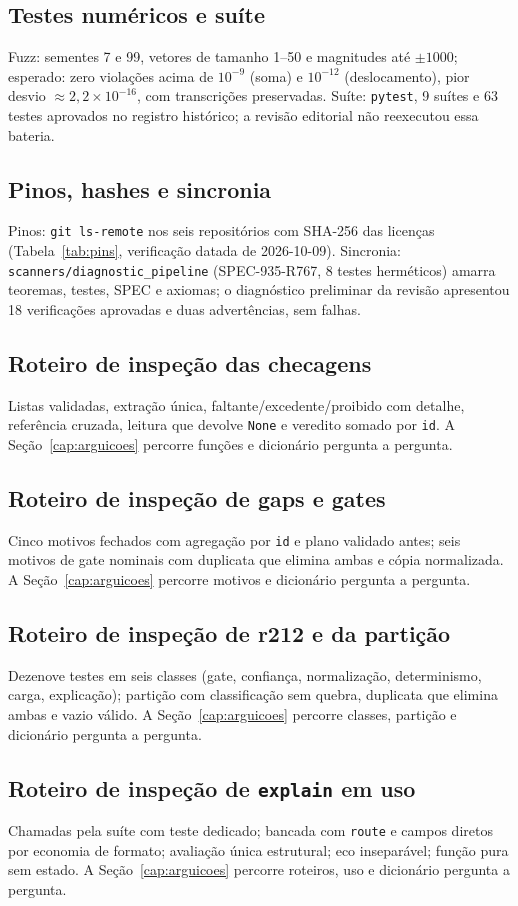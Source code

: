 \subsection{Testes numéricos e suíte}
Fuzz: sementes 7 e 99, vetores de tamanho 1--50 e magnitudes até $\pm1000$; esperado: zero violações acima de $10^{-9}$ (soma) e $10^{-12}$ (deslocamento), pior desvio $\approx2{,}2\times10^{-16}$, com transcrições preservadas. Suíte: \texttt{pytest}, 9 suítes e 63 testes aprovados no registro histórico; a revisão editorial não reexecutou essa bateria.
\subsection{Pinos, hashes e sincronia}
Pinos: \texttt{git ls-remote} nos seis repositórios com SHA-256 das licenças (Tabela~\ref{tab:pins}, verificação datada de 2026-10-09). Sincronia: \nolinkurl{scanners/diagnostic_pipeline} (SPEC-935-R767, 8 testes herméticos) amarra teoremas, testes, SPEC e axiomas; o diagnóstico preliminar da revisão apresentou 18 verificações aprovadas e duas advertências, sem falhas.
\subsection{Roteiro de inspeção das checagens}
Listas validadas, extração única, faltante/excedente/proibido com detalhe, referência cruzada, leitura que devolve \texttt{None} e veredito somado por \texttt{id}. A Seção~\ref{cap:arguicoes} percorre funções e dicionário pergunta a pergunta.
\subsection{Roteiro de inspeção de gaps e gates}
Cinco motivos fechados com agregação por \texttt{id} e plano validado antes; seis motivos de gate nominais com duplicata que elimina ambas e cópia normalizada. A Seção~\ref{cap:arguicoes} percorre motivos e dicionário pergunta a pergunta.
\subsection{Roteiro de inspeção de r212 e da partição}
Dezenove testes em seis classes (gate, confiança, normalização, determinismo, carga, explicação); partição com classificação sem quebra, duplicata que elimina ambas e vazio válido. A Seção~\ref{cap:arguicoes} percorre classes, partição e dicionário pergunta a pergunta.
\subsection{Roteiro de inspeção de \texttt{explain} em uso}
Chamadas pela suíte com teste dedicado; bancada com \texttt{route} e campos diretos por economia de formato; avaliação única estrutural; eco inseparável; função pura sem estado. A Seção~\ref{cap:arguicoes} percorre roteiros, uso e dicionário pergunta a pergunta.
